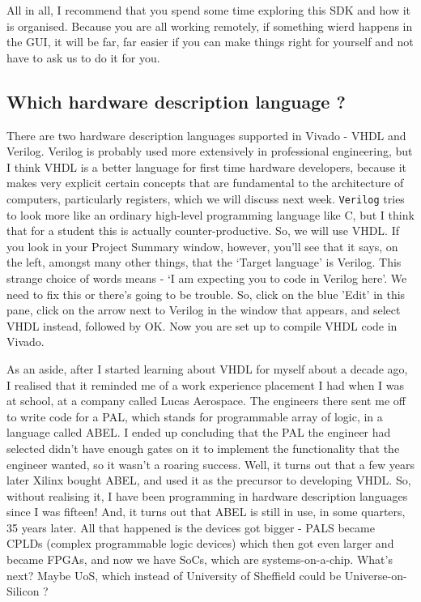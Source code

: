 \documentclass[../physical_computing.tex]{subfiles}
\begin{document}
All in all, I recommend that you spend some time exploring this SDK and how it is organised. Because you are all working remotely, if something wierd happens in the GUI, it will be far, far easier if you can make things right for yourself and not have to ask us to do it for you.

\subsection{Which hardware description language ?}
\label{sec:which_hdl}

There are two hardware description languages supported in Vivado - VHDL and Verilog. Verilog is probably used more extensively in professional engineering, but I think VHDL is a better language for first time hardware developers, because it makes very explicit certain concepts that are fundamental to the architecture of computers, particularly registers, which we will discuss next week. \texttt{Verilog} tries to look more like an ordinary high-level programming language like C, but I think that for a student this is actually counter-productive. So, we will use VHDL. If you look in your Project Summary window, however, you'll see that it says, on the left, amongst many other things, that the `Target language' is Verilog. This strange choice of words means - `I am expecting you to code in Verilog here'. We need to fix this or there's going to be trouble. So, click on the blue 'Edit' in this pane, click on the arrow next to Verilog in the window that appears, and select VHDL instead, followed by OK. Now you are set up to compile VHDL code in Vivado.

As an aside, after I started learning about VHDL for myself about a decade ago, I realised that it reminded me of a work experience placement I had when I was at school, at a company called Lucas Aerospace. The engineers there sent me off to write code for a PAL, which stands for programmable array of logic, in a language called ABEL. I ended up concluding that the PAL the engineer had selected didn't have enough gates on it to implement the functionality that the engineer wanted, so it wasn't a roaring success. Well, it turns out that a few years later Xilinx bought ABEL, and used it as the precursor to developing VHDL. So, without realising it, I have been programming in hardware description languages since I was fifteen! And, it turns out that ABEL is still in use, in some quarters, 35 years later. All that happened is the devices got bigger - PALS became CPLDs (complex programmable logic devices) which then got even larger and became FPGAs, and now we have SoCs, which are systems-on-a-chip. What's next? Maybe UoS, which instead of University of Sheffield could be Universe-on-Silicon ?
\end{document}
